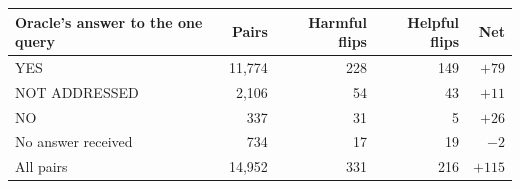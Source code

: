 \begin{tabular}{lrrrr}
\toprule
Oracle's answer to the one query & Pairs & Harmful flips & Helpful flips & Net \\
\midrule
YES & 11,774 & 228 & 149 & $+79$ \\
NOT ADDRESSED & 2,106 & 54 & 43 & $+11$ \\
NO & 337 & 31 & 5 & $+26$ \\
No answer received & 734 & 17 & 19 & $-2$ \\
\midrule
All pairs & 14,952 & 331 & 216 & $+115$ \\
\bottomrule
\end{tabular}
